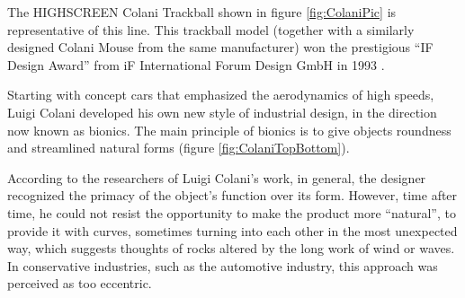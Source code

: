 \documentclass[11pt, a4paper]{article}
\begin{document}
The HIGHSCREEN Colani Trackball shown in figure \ref{fig:ColaniPic} is representative of this line. This trackball model (together with a similarly designed Colani Mouse from the same manufacturer) won the prestigious “IF Design Award” from iF International Forum Design GmbH in 1993 \cite{award}.

Starting with concept cars that emphasized the aerodynamics of high speeds, Luigi Colani developed his own new style of industrial design, in the direction now known as bionics. The main principle of bionics is to give objects roundness and streamlined natural forms (figure \ref{fig:ColaniTopBottom}).

{According to the researchers of Luigi Colani's work, in general, the designer recognized the primacy of the object's function over its form. However, time after time, he could not resist the opportunity to make the product more “natural”, to provide it with curves, sometimes turning into each other in the most unexpected way, which suggests thoughts of rocks altered by the long work of wind or waves. In conservative industries, such as the automotive industry, this approach was perceived as too eccentric.}

~
\end{document}

